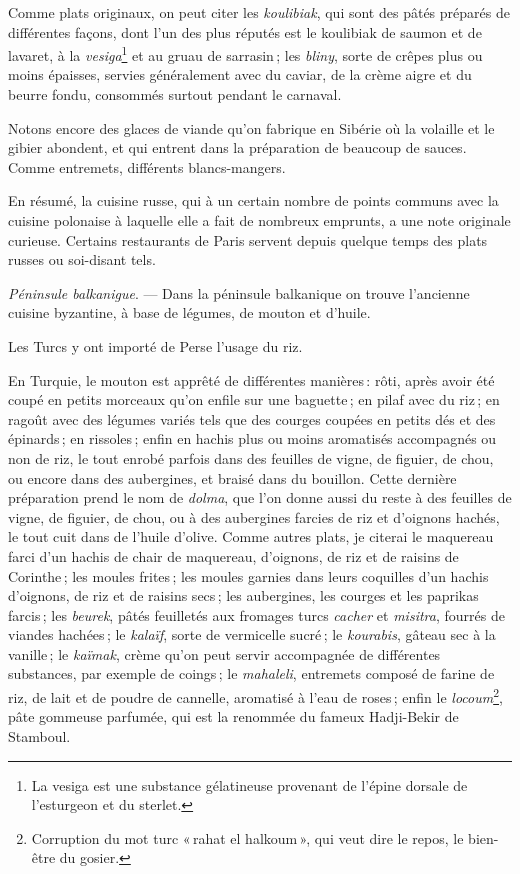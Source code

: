 Comme plats originaux, on peut citer les \textit{koulibiak}, qui sont des pâtés
préparés de différentes façons, dont l'un des plus réputés est le koulibiak de
saumon et de lavaret, à la \textit{vesiga}\footnote{La vesiga est une substance
gélatineuse provenant de l'épine dorsale de l'esturgeon et du sterlet.} et au
gruau de sarrasin ; les \textit{bliny}, sorte de crêpes plus ou moins épaisses,
servies généralement avec du caviar, de la crème aigre et du beurre fondu,
consommés surtout pendant le carnaval.

Notons encore des glaces de viande qu'on fabrique en Sibérie où la volaille et le
gibier abondent, et qui entrent dans la préparation de beaucoup de sauces.
Comme entremets, différents blancs-mangers.

En résumé, la cuisine russe, qui à un certain nombre de points communs
avec la cuisine polonaise à laquelle elle a fait de nombreux emprunts, a une note
originale curieuse. Certains restaurants de Paris servent depuis quelque temps
des plats russes ou soi-disant tels.

\sk

\textit{Péninsule balkanigue}. — Dans la péninsule balkanique on trouve
l'ancienne cuisine byzantine, à base de légumes, de mouton et d'huile.

Les Turcs y ont importé de Perse l'usage du riz.

En Turquie, le mouton est apprêté de différentes manières : rôti, après avoir
été coupé en petits morceaux qu'on enfile sur une baguette ; en pilaf avec du
riz ; en ragoût avec des légumes variés tels que des courges coupées en petits
dés et des épinards ; en rissoles ; enfin en hachis plus ou moins aromatisés
accompagnés ou non de riz, le tout enrobé parfois dans des feuilles de vigne,
de figuier, de chou, ou encore dans des aubergines, et braisé dans du bouillon.
Cette dernière préparation prend le nom de \textit{dolma}, que l'on donne aussi
du reste à des feuilles de vigne, de figuier, de chou, ou à des aubergines
farcies de riz et d'oignons hachés, le tout cuit dans de l'huile d'olive. Comme
autres plats, je citerai le maquereau farci d'un hachis de chair de maquereau,
d'oignons, de riz et de raisins de Corinthe ; les moules frites ; les moules
garnies dans leurs coquilles d'un hachis d'oignons, de riz et de raisins secs ;
les aubergines, les courges et les paprikas farcis ; les \textit{beurek}, pâtés
feuilletés aux fromages turcs \textit{cacher} et \textit{misitra}, fourrés de
viandes hachées ; le \textit{kalaïf}, sorte de vermicelle sucré ; le
\textit{kourabis}, gâteau sec à la vanille ; le \textit{kaïmak}, crème qu'on
peut servir accompagnée de différentes substances, par exemple de coings ; le
\textit{mahaleli}, entremets composé de farine de riz, de lait et de poudre de
cannelle, aromatisé à l'eau de roses ; enfin le
\textit{locoum}\footnote{Corruption du mot turc « rahat el halkoum », qui veut
dire le repos, le bien-être du gosier.}, pâte gommeuse parfumée, qui est la
renommée du fameux Hadji-Bekir de Stamboul.


